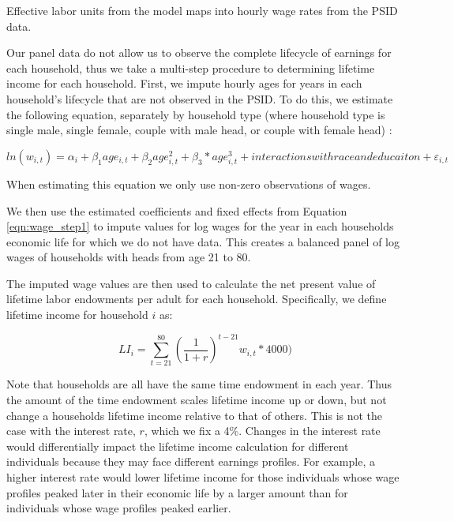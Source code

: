 \documentclass[article,11pt,letterpaper,fleqn]{article}
\theoremstyle{definition}
\numberwithin{equation}{section}
\begin{document}
Effective labor units from the model maps into hourly wage rates from the PSID data.

Our panel data do not allow us to observe the complete lifecycle of earnings for each household, thus we take a multi-step procedure to determining lifetime income for each household.  First, we impute hourly ages for years in each household's lifecycle that are not observed in the PSID.  To do this, we estimate the following equation, separately by household type (where household type is single male, single female, couple with male head, or couple with female head) :

\begin{equation}
\label{eqn:wage_step1}
ln(w_{i,t}) = \alpha_{i} + \beta_{1}age_{i,t} + \beta_{2}age_{i,t}^{2} + \beta_{3}*age_{i,t}^{3}+interactions with race and educaiton + \varepsilon_{i,t}
\end{equation}

When estimating this equation we only use non-zero observations of wages.

We then use the estimated coefficients and fixed effects from Equation \ref{eqn:wage_step1} to impute values for log wages for the year in each households economic life for which we do not have data.  This creates a balanced panel of log wages of households with heads from age 21 to 80.   

The imputed wage values are then used to calculate the net present value of lifetime labor endowments per adult for each household.  Specifically, we define lifetime income for household $i$ as: 

\begin{equation}
\label{eqn:LI}
LI_{i} = \sum_{t=21}^{80}  \left(\frac{1}{1+r}\right)^{t-21}w_{i,t}*4000)
\end{equation}

\noindent\noindent Note that households are all have the same time endowment in each year.  Thus the amount of the time endowment scales lifetime income up or down, but not change a households lifetime income relative to that of others.  This is not the case with the interest rate, $r$, which we fix a 4\%.  Changes in the interest rate would differentially impact the lifetime income calculation for different individuals because they may face different earnings profiles.  For example, a higher interest rate would lower lifetime income for those individuals whose wage profiles peaked later in their economic life by a larger amount than for individuals whose wage profiles peaked earlier.  
\end{document}
